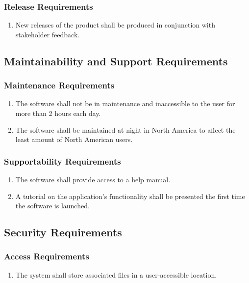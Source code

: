 \documentclass{article}
\begin{document}
\subsubsection{Release Requirements}
\begin{enumerate}[RR1]
    \item New releases of the product shall be produced in conjunction with stakeholder feedback.
\end{enumerate}

\subsection{Maintainability and Support Requirements}
\subsubsection{Maintenance Requirements}
\begin{enumerate}[MR1]
    \item The software shall not be in maintenance and inaccessible to the user for more than 2 hours each day.
    \item The software shall be maintained at night in North America to affect the least amount of North American users.
\end{enumerate}

\subsubsection{Supportability Requirements}
\begin{enumerate}[SUR1]
    \item The software shall provide access to a help manual.
    \item A tutorial on the application's functionality shall be presented the first time the software is launched.
\end{enumerate}

\subsection{Security Requirements}
\subsubsection{Access Requirements}
\begin{enumerate}[{A}CR1]
    \item The system shall store associated files in a user-accessible location.
\end{enumerate}
\end{document}
